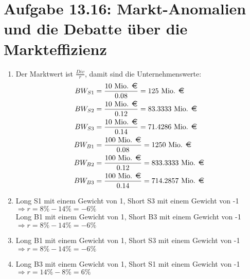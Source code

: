 \documentclass{article}
\begin{document}
	\section*{Aufgabe 13.16: Markt-Anomalien und die Debatte über die Markteffizienz}
	\begin{enumerate}[label=(\alph*)]
		\item Der Marktwert ist $\frac{Div}{r}$, damit sind die Unternehmenswerte:
		\begin{align}
			BW_{S1} &= \frac{10\text{ Mio. \EUR}}{0.08} = 125\text{ Mio. \EUR} \notag \\
			BW_{S2} &= \frac{10\text{ Mio. \EUR}}{0.12} = 83.3333\text{ Mio. \EUR} \notag \\
			BW_{S3} &= \frac{10\text{ Mio. \EUR}}{0.14} = 71.4286\text{ Mio. \EUR} \notag \\
			BW_{B1} &= \frac{100\text{ Mio. \EUR}}{0.08} = 1250\text{ Mio. \EUR} \notag \\
			BW_{B2} &= \frac{100\text{ Mio. \EUR}}{0.12} = 833.3333\text{ Mio. \EUR} \notag \\
			BW_{B3} &= \frac{100\text{ Mio. \EUR}}{0.14} = 714.2857\text{ Mio. \EUR} \notag
		\end{align}
		\item Long S1 mit einem Gewicht von 1, Short S3 mit einem Gewicht von -1 $\Rightarrow r=8\% - 14\%=-6\%$ \\
		Long B1 mit einem Gewicht von 1, Short B3 mit einem Gewicht von -1 $\Rightarrow r=8\% - 14\%=-6\%$
		\item Long B1 mit einem Gewicht von 1, Short S3 mit einem Gewicht von -1 $\Rightarrow r=8\% - 14\%=-6\%$
		\item Long B3 mit einem Gewicht von 1, Short S1 mit einem Gewicht von -1 $\Rightarrow r=14\% - 8\%=6\%$
	\end{enumerate}
	
\end{document}
